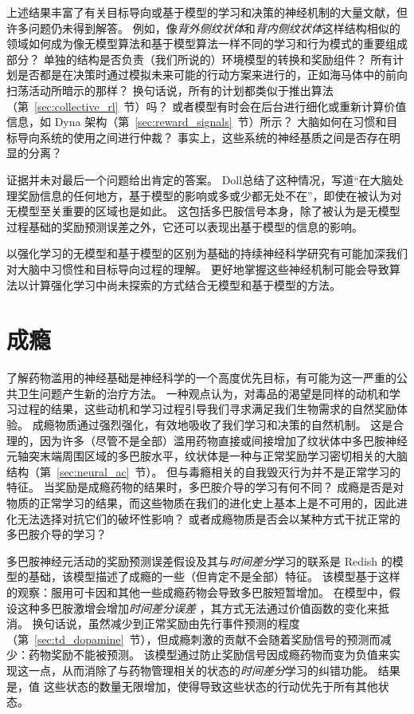上述结果丰富了有关目标导向或基于模型的学习和决策的神经机制的大量文献，但许多问题仍未得到解答。
例如，像\textit{背外侧纹状体}和\textit{背内侧纹状体}这样结构相似的领域如何成为像无模型算法和基于模型算法一样不同的学习和行为模式的重要组成部分？
单独的结构是否负责（我们所说的）环境模型的转换和奖励组件？
所有计划是否都是在决策时通过模拟未来可能的行动方案来进行的，正如海马体中的前向扫荡活动所暗示的那样？
换句话说，所有的计划都类似于推出算法（第~\ref{sec:collective_rl}~节）吗？
或者模型有时会在后台进行细化或重新计算价值信息，如 Dyna 架构（第~\ref{sec:reward_signals}~节）所示？
大脑如何在习惯和目标导向系统的使用之间进行仲裁？
事实上，这些系统的神经基质之间是否存在明显的分离？


证据并未对最后一个问题给出肯定的答案。
Doll\cite{doll2012ubiquity}总结了这种情况，写道“在大脑处理奖励信息的任何地方，基于模型的影响或多或少都无处不在”，即使在被认为对无模型至关重要的区域也是如此。
这包括多巴胺信号本身，除了被认为是无模型过程基础的奖励预测误差之外，它还可以表现出基于模型的信息的影响。


以强化学习的无模型和基于模型的区别为基础的持续神经科学研究有可能加深我们对大脑中习惯性和目标导向过程的理解。
更好地掌握这些神经机制可能会导致算法以计算强化学习中尚未探索的方式结合无模型和基于模型的方法。


\section{成瘾}


了解药物滥用的神经基础是神经科学的一个高度优先目标，有可能为这一严重的公共卫生问题产生新的治疗方法。
一种观点认为，对毒品的渴望是同样的动机和学习过程的结果，这些动机和学习过程引导我们寻求满足我们生物需求的自然奖励体验。
成瘾物质通过强烈强化，有效地吸收了我们学习和决策的自然机制。
这是合理的，因为许多（尽管不是全部）滥用药物直接或间接增加了纹状体中多巴胺神经元轴突末端周围区域的多巴胺水平，纹状体是一种与正常奖励学习密切相关的大脑结构（第~\ref{sec:neural_ac}~节）。
但与毒瘾相关的自我毁灭行为并不是正常学习的特征。
当奖励是成瘾药物的结果时，多巴胺介导的学习有何不同？
成瘾是否是对物质的正常学习的结果，而这些物质在我们的进化史上基本上是不可用的，因此进化无法选择对抗它们的破坏性影响？
或者成瘾物质是否会以某种方式干扰正常的多巴胺介导的学习？


多巴胺神经元活动的奖励预测误差假设及其与\textit{时间差分}学习的联系是 Redish\cite{redish2004addiction} 的模型的基础，该模型描述了成瘾的一些（但肯定不是全部）特征。
该模型基于这样的观察：服用可卡因和其他一些成瘾药物会导致多巴胺短暂增加。
在模型中，假设这种多巴胺激增会增加\textit{时间差分误差} ，其方式无法通过价值函数的变化来抵消。
换句话说，虽然减少到正常奖励由先行事件预测的程度（第~\ref{sec:td_dopamine}~节），但成瘾刺激的贡献不会随着奖励信号的预测而减少：药物奖励不能被预测。
该模型通过防止奖励信号因成瘾药物而变为负值来实现这一点，从而消除了与药物管理相关的状态的\textit{时间差分}学习的纠错功能。
结果是，值 这些状态的数量无限增加，使得导致这些状态的行动优先于所有其他状态。


